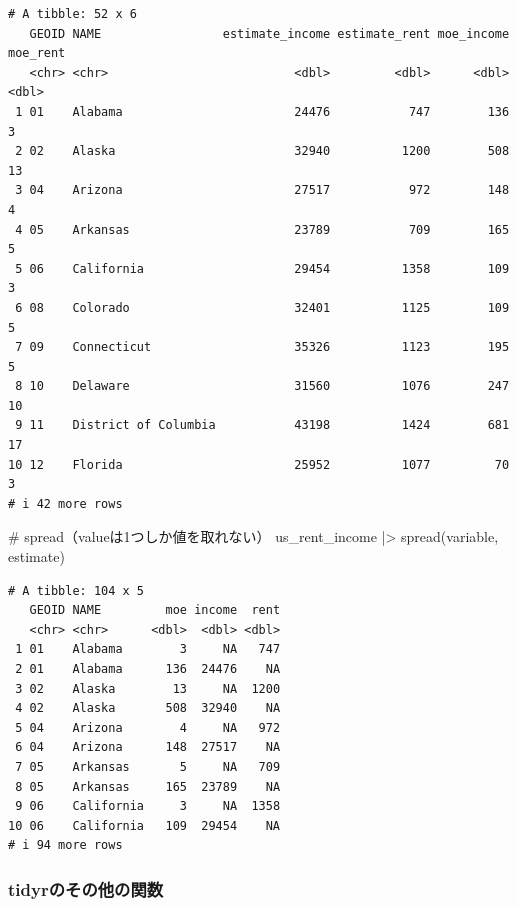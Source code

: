 \documentclass[
  letterpaper,
  DIV=11,
  numbers=noendperiod]{scrreprt}
\newenvironment{Shaded}{\begin{snugshade}}{\end{snugshade}}
\newcommand{\CommentTok}[1]{\textcolor[rgb]{0.37,0.37,0.37}{#1}}
\newcommand{\FunctionTok}[1]{\textcolor[rgb]{0.28,0.35,0.67}{#1}}
\newcommand{\NormalTok}[1]{\textcolor[rgb]{0.00,0.23,0.31}{#1}}
\newcommand{\SpecialCharTok}[1]{\textcolor[rgb]{0.37,0.37,0.37}{#1}}
\begin{document}
\begin{verbatim}
# A tibble: 52 x 6
   GEOID NAME                 estimate_income estimate_rent moe_income moe_rent
   <chr> <chr>                          <dbl>         <dbl>      <dbl>    <dbl>
 1 01    Alabama                        24476           747        136        3
 2 02    Alaska                         32940          1200        508       13
 3 04    Arizona                        27517           972        148        4
 4 05    Arkansas                       23789           709        165        5
 5 06    California                     29454          1358        109        3
 6 08    Colorado                       32401          1125        109        5
 7 09    Connecticut                    35326          1123        195        5
 8 10    Delaware                       31560          1076        247       10
 9 11    District of Columbia           43198          1424        681       17
10 12    Florida                        25952          1077         70        3
# i 42 more rows
\end{verbatim}

\begin{Shaded}
\begin{Highlighting}[]
\CommentTok{\# spread（valueは1つしか値を取れない）}
\NormalTok{us\_rent\_income }\SpecialCharTok{|\textgreater{}} \FunctionTok{spread}\NormalTok{(variable, estimate)}
\end{Highlighting}
\end{Shaded}

\begin{verbatim}
# A tibble: 104 x 5
   GEOID NAME         moe income  rent
   <chr> <chr>      <dbl>  <dbl> <dbl>
 1 01    Alabama        3     NA   747
 2 01    Alabama      136  24476    NA
 3 02    Alaska        13     NA  1200
 4 02    Alaska       508  32940    NA
 5 04    Arizona        4     NA   972
 6 04    Arizona      148  27517    NA
 7 05    Arkansas       5     NA   709
 8 05    Arkansas     165  23789    NA
 9 06    California     3     NA  1358
10 06    California   109  29454    NA
# i 94 more rows
\end{verbatim}

\hypertarget{tidyrux306eux305dux306eux4ed6ux306eux95a2ux6570}{%
\subsubsection{tidyrのその他の関数}\label{tidyrux306eux305dux306eux4ed6ux306eux95a2ux6570}}
\end{document}
